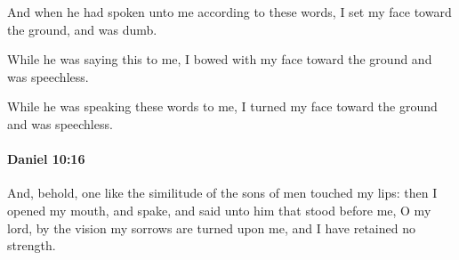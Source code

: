 			\begin{versebox}
					\item[BHS] 
					\item[LXX] 
					\item[ASV] And when he had spoken unto me according to these words, I set my face toward the ground, and was dumb.
					\item[NIV] While he was saying this to me, I bowed with my face toward the ground and was speechless.
					\item[NRSV] While he was speaking these words to me, I turned my face toward the ground and was speechless.
			\end{versebox}

		\paragraph{Daniel 10:16} %
			\label{DANIEL-10-16}

			And, behold, one like the similitude of the sons of men touched my lips: then I opened my mouth, and spake, and said unto him that stood before me, O my lord, by the vision my sorrows are turned upon me, and I have retained no strength.

